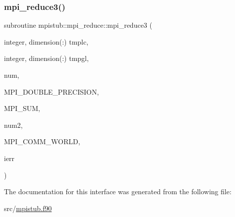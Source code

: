 \mbox{\label{interfacempistub_1_1mpi__reduce_a33962320ef3960eb86477c8452aba795}} 
\subsubsection{\texorpdfstring{mpi\_reduce3()}{mpi\_reduce3()}}
{\footnotesize\ttfamily subroutine mpistub\+::mpi\+\_\+reduce\+::mpi\+\_\+reduce3 (\begin{DoxyParamCaption}\item[{integer, dimension(\+:)}]{tmplc,  }\item[{integer, dimension(\+:)}]{tmpgl,  }\item[{}]{num,  }\item[{}]{M\+P\+I\+\_\+\+D\+O\+U\+B\+L\+E\+\_\+\+P\+R\+E\+C\+I\+S\+I\+ON,  }\item[{}]{M\+P\+I\+\_\+\+S\+UM,  }\item[{}]{num2,  }\item[{}]{M\+P\+I\+\_\+\+C\+O\+M\+M\+\_\+\+W\+O\+R\+LD,  }\item[{}]{ierr }\end{DoxyParamCaption})}



The documentation for this interface was generated from the following file\+:\begin{DoxyCompactItemize}
\item 
src/\mbox{\hyperlink{mpistub_8f90}{mpistub.\+f90}}\end{DoxyCompactItemize}

